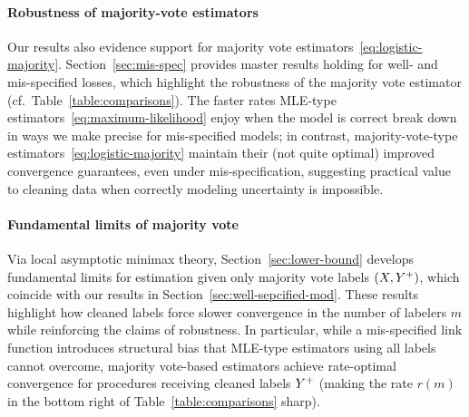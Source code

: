 \paragraph{Robustness of majority-vote estimators}
Our results also evidence support for majority vote
estimators~\eqref{eq:logistic-majority}.  Section~\ref{sec:mis-spec}
provides master results holding for well- and mis-specified losses, which
highlight the robustness of the majority vote estimator
(cf.\ Table~\ref{table:comparisons}).
%
The faster rates MLE-type estimators~\eqref{eq:maximum-likelihood} enjoy
when the model is correct break down in ways we make precise for
mis-specified models; in contrast, majority-vote-type
estimators~\eqref{eq:logistic-majority} maintain their (not quite optimal)
improved convergence guarantees, even under mis-specification, suggesting
practical value to cleaning data when correctly modeling uncertainty is
impossible.

\paragraph{Fundamental limits of majority vote}
Via local asymptotic minimax theory, Section~\ref{sec:lower-bound} develops
fundamental limits for estimation given only majority vote labels $(X,
Y^+)$, which coincide with our results in
Section~\ref{sec:well-sepcified-mod}.
%
These results highlight how cleaned labels force slower
convergence in the number of labelers $m$ while reinforcing the claims of
robustness.
%
In particular, while a mis-specified link function introduces structural
bias that MLE-type estimators using all labels cannot overcome, majority
vote-based estimators achieve rate-optimal convergence for procedures
receiving cleaned labels $Y^+$ (making the rate $r(m)$ in the bottom right
of Table~\ref{table:comparisons} sharp).




